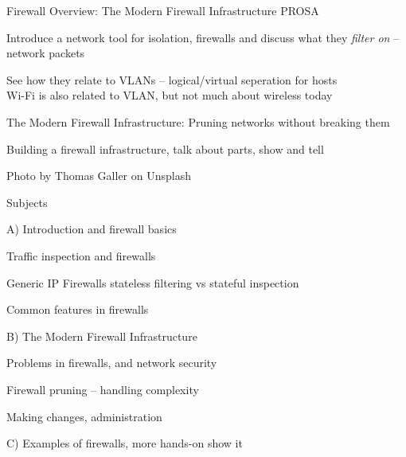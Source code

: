 \documentclass[Screen16to9,17pt]{foils}
\begin{document}
\mytitlepage
{Firewall Overview: The Modern Firewall Infrastructure}
{PROSA}


\hlkprofiluk




\begin{list2}
\item Introduce a network tool for isolation, firewalls and discuss what they \emph{filter on} -- network packets
\item See how they relate to VLANs -- logical/virtual seperation for hosts\\
Wi-Fi is also related to VLAN, but not much about wireless today
\item The Modern Firewall Infrastructure: Pruning networks without breaking them
\item Building a firewall infrastructure, talk about parts, show and tell
\end{list2}

\hfill {\small Photo by Thomas Galler on Unsplash}



\begin{list1}
\item Subjects
\item A) Introduction and firewall basics
\begin{list2}
\item Traffic inspection and firewalls
\item Generic IP Firewalls stateless filtering vs stateful inspection
\item Common features in firewalls
\end{list2}
\item B) The Modern Firewall Infrastructure
\begin{list2}
\item Problems in firewalls, and network security
\item Firewall pruning -- handling complexity
\item Making changes, administration
\end{list2}
\item C) Examples of firewalls, more hands-on show it
\end{list1}

\end{document}
